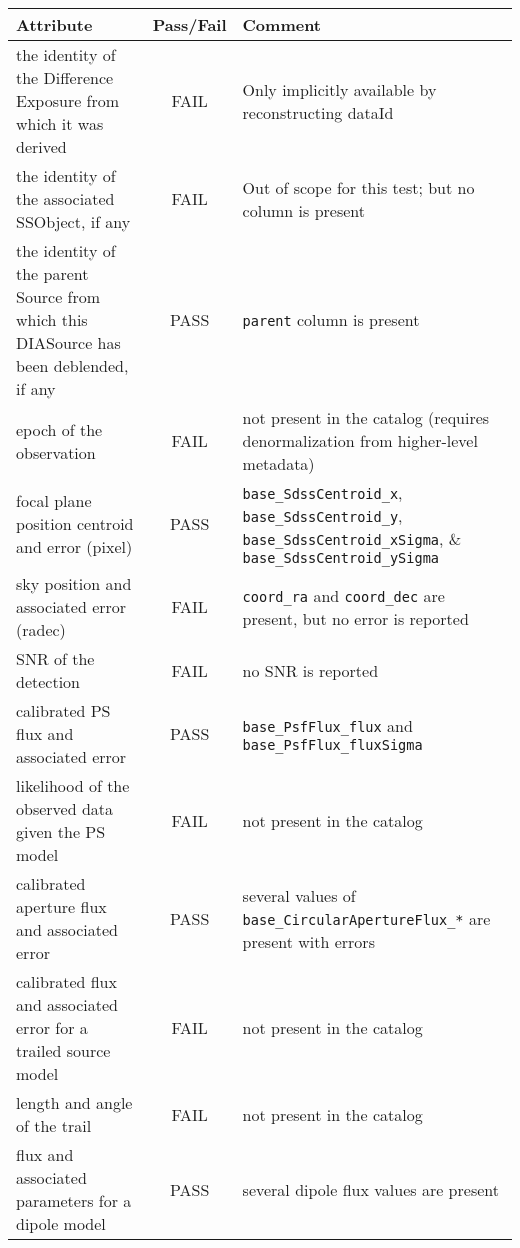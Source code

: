 \documentclass[DM,lsstdraft,STR,toc]{lsstdoc}
\begin{document}
\begin{table}[h]
    \begin{tabular}{|p{}|c|p{}|}
        \hline
        Attribute & Pass/Fail & Comment \\
        \hline\hline
        the identity of the Difference Exposure from which it was derived & FAIL & Only implicitly available by reconstructing dataId \\
        \hline
        the identity of the associated SSObject, if any & FAIL & Out of scope for this test; but no column is present \\
        \hline
        the identity of the parent Source from which this DIASource has been deblended, if any & PASS & \texttt{parent} column is present \\
        \hline
        epoch of the observation & FAIL & not present in the catalog (requires denormalization from higher-level metadata) \\
        \hline
        focal plane position centroid and error (pixel) & PASS &
        \texttt{base\_SdssCentroid\_x},
        \texttt{base\_SdssCentroid\_y},
        \texttt{base\_SdssCentroid\_xSigma}, \&
        \texttt{base\_SdssCentroid\_ySigma} \\
        \hline
        sky position and associated error (radec) & FAIL & \texttt{coord\_ra} and \texttt{coord\_dec} are present, but no error is reported \\
        \hline
        SNR of the detection & FAIL & no SNR is reported \\
        \hline
        calibrated PS flux and associated error & PASS & \texttt{base\_PsfFlux\_flux} and \texttt{base\_PsfFlux\_fluxSigma} \\
        \hline
        likelihood of the observed data given the PS model & FAIL & not present in the catalog \\
        \hline
        calibrated aperture flux and associated error & PASS & several values of \texttt{base\_CircularApertureFlux\_*} are present with errors \\
        \hline
        calibrated flux and associated error for a trailed source model & FAIL & not present in the catalog \\
        \hline
        length and angle of the trail & FAIL & not present in the catalog \\
        \hline
        flux and associated parameters for a dipole model & PASS & several dipole flux values are present \\

\end{tabular}
\end{table}
\end{document}
